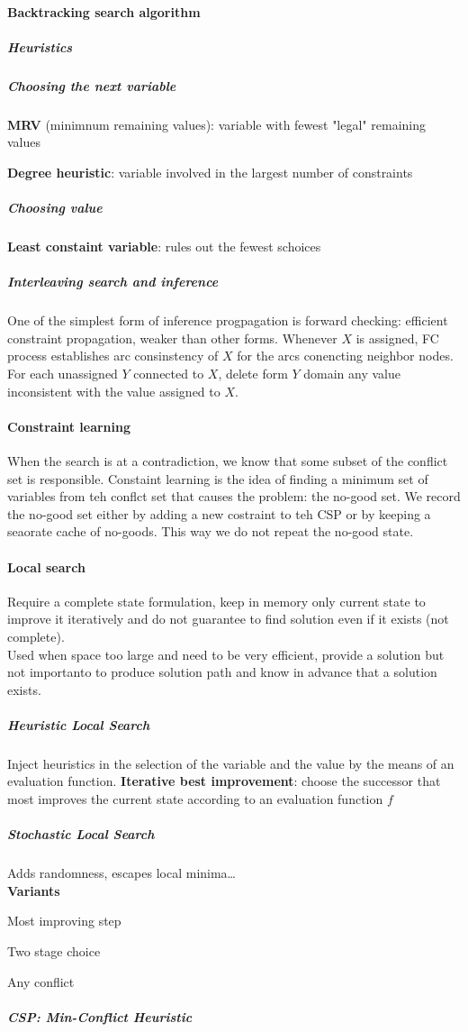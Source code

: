 \documentclass[10pt]{report}
\begin{document}
\paragraph{Backtracking search algorithm}
\subparagraph{Heuristics}
\subparagraph{Choosing the next variable}\begin{list}{}{}
	\item \textbf{MRV} (minimnum remaining values): variable with fewest "legal" remaining values
	\item \textbf{Degree heuristic}: variable involved in the largest number of constraints
\end{list}
\subparagraph{Choosing value} \begin{list}{}{}
	\item \item \textbf{Least constaint variable}: rules out the fewest schoices
\end{list}
\subparagraph{Interleaving search and inference} One of the simplest form of inference progpagation is forward checking: efficient constraint propagation, weaker than other forms. Whenever $X$ is assigned, FC process establishes arc consinstency of $X$ for the arcs conencting neighbor nodes. For each unassigned $Y$ connected to $X$, delete form $Y$ domain any value inconsistent with the value assigned to $X$.
\paragraph{Constraint learning} When the search is at a contradiction, we know that some subset of the conflict set is responsible. Constaint learning is the idea of finding a minimum set of variables from teh conflct set that causes the problem: the no-good set. We record the no-good set either by adding a new costraint to teh CSP or by keeping a seaorate cache of no-goods. This way we do not repeat the no-good state.
\paragraph{Local search} Require a complete state formulation, keep in memory only current state to improve it iteratively and do not guarantee to find solution even if it exists (not complete).\\
Used when space too large and need to be very efficient, provide a solution but not importanto to produce solution path and know in advance that a solution exists.
\subparagraph{Heuristic Local Search} Inject heuristics in the selection of the variable and the value by the means of an evaluation function. \textbf{Iterative best improvement}: choose the successor that most improves the current state according to an evaluation function $f$
\subparagraph{Stochastic Local Search} Adds randomness, escapes local minima\ldots\\
\textbf{Variants} \begin{list}{}{}
	\item Most improving step
	\item Two stage choice
	\item Any conflict
\end{list}
\subparagraph{CSP: Min-Conflict Heuristic}
\end{document}
